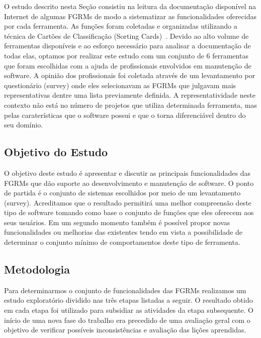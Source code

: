 O estudo descrito nesta Seção consistiu na leitura da documentação disponível na
Internet de algumas FGRMs de modo a sistematizar as funcionalidades
o\-fe\-re\-ci\-das por cada ferramenta. As funções foram coletadas e organizadas
utilizando a técnica de Cartões de Classificação (Sorting Cards)~\cite{5070993,
    rugg2005sorting}. Devido ao alto volume de ferramentas disponíveis e ao
esforço necessário para analisar a documentação de todas elas, optamos por
realizar este estudo com um conjunto de 6 ferramentas que foram escolhidas com a
ajuda de profissionais envolvidos em manutenção de software. A opinião dos
profissionais foi coletada através de um levantamento por questionário (survey)
onde eles selecionavam as FGRMs que julgavam mais representativas dentre uma
lista previamente definida. A representatividade neste contexto não está no
número de projetos que utiliza determinada ferramenta, mas pelas caraterísticas
que o software possui e que o torna diferenciável dentro do seu domínio.

\subsection{Objetivo do Estudo}
\label{subsec:caracterizacao_objetivo_do_capitulo}

O objetivo deste estudo é apresentar e discutir as principais funcionalidades
das FGRMs que dão suporte ao desenvolvimento e manutenção de software. O ponto
de partida é o conjunto de sistemas escolhidos por meio de um levantamento
(survey). Acreditamos que o resultado permitirá uma melhor compreensão deste
tipo de software tomando como base o conjunto de funções que eles oferecem aos
seus usuários. Em um segundo momento também é possível propor novas
funcionalidades ou melhorias das existentes tendo em vista a possibilidade de
determinar o conjunto mínimo de comportamentos deste tipo de ferramenta.

\subsection{Metodologia}
\label{subsec:metodologia}

Para determinarmos o conjunto de funcionalidades das FGRMs realizamos um estudo
exploratório dividido nas três etapas listadas a seguir. O resultado obtido em
cada etapa foi utilizado para subsidiar as atividades da etapa subsequente. O
início de uma nova fase do trabalho era precedido de uma avaliação geral com o
objetivo de verificar possíveis inconsistências e avaliação das lições
aprendidas.

